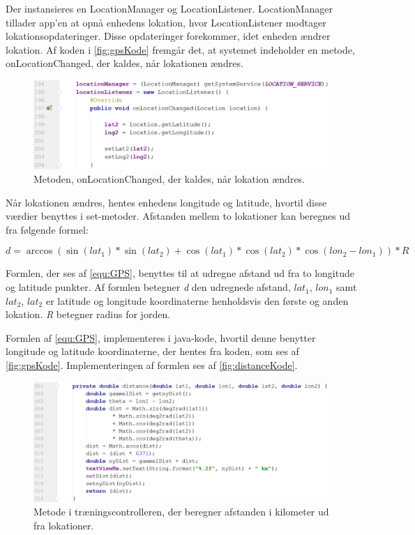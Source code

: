 Der instansieres en LocationManager og LocationListener. LocationManager tillader app'en at opnå enhedens lokation, hvor LocationListener modtager lokationsopdateringer. Disse opdateringer forekommer, idet enheden ændrer lokation.\cite{LocationManager, LocationListener} Af koden i \autoref{fig:gpsKode} fremgår det, at systemet indeholder en metode, onLocationChanged, der kaldes, når lokationen ændres. 

\begin{figure} [H]
\centering
\includegraphics[width=1\textwidth]{figures/imple/gpsKode}
\caption{Metoden, onLocationChanged, der kaldes, når lokation ændres.}
\label{fig:gpsKode}
\end{figure} 

Når lokationen ændres, hentes enhedens longitude og latitude, hvortil disse værdier benyttes i set-metoder. Afstanden mellem to lokationer kan beregnes ud fra følgende formel:

\begin{equation} \label{equ:GPS}
d = \arccos(\sin(lat_1)*\sin(lat_2)+\cos(lat_1)*\cos(lat_2)*\cos(lon_2-lon_1))*R
\end{equation}

Formlen, der ses af \autoref{equ:GPS}, benyttes til at udregne afstand ud fra to longitude og latitude punkter. Af formlen betegner \textit{d} den udregnede afstand, \textit{$lat_1$}, \textit{$lon_1$} samt \textit{$lat_2$}, \textit{$lat_2$} er latitude og longitude koordinaterne henholdsvis den første og anden lokation. \textit{R} betegner radius for jorden. \cite{Deza2009}    

Formlen af \autoref{equ:GPS}, implementeres i java-kode, hvortil denne benytter longitude og latitude koordinaterne, der hentes fra koden, som ses af \autoref{fig:gpsKode}. Implementeringen af formlen ses af \autoref{fig:distanceKode}.

\begin{figure} [H]
\centering
\includegraphics[width=1\textwidth]{figures/imple/distanceKode}
\caption{Metode i træningscontrolleren, der beregner afstanden i kilometer ud fra lokationer.}
\label{fig:distanceKode}
\end{figure} 

